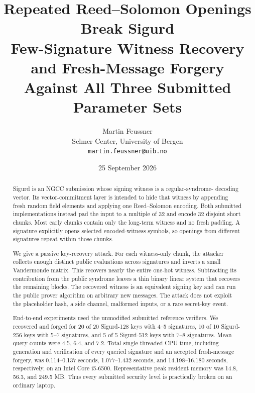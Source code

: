 \documentclass[11pt,a4paper]{article}
\title{\bfseries Repeated Reed--Solomon Openings Break Sigurd\\
\large Few-Signature Witness Recovery and Fresh-Message Forgery\\
Against All Three Submitted Parameter Sets}
\author{Martin Feussner\\
\small Selmer Center, University of Bergen\\
\small \texttt{martin.feussner@uib.no}}
\date{25 September 2026}
\begin{document}
\maketitle

\begin{center}
\end{center}
\vspace{0.7em}

\begin{abstract}
Sigurd is an NGCC submission whose signing witness is a regular-syndrome-
decoding vector.  Its vector-commitment layer is intended to hide that witness
by appending fresh random field elements and applying one Reed--Solomon
encoding.  Both submitted implementations instead pad the input to a multiple
of 32 and encode 32 disjoint short chunks.  Most early chunks contain only the
long-term witness and no fresh padding.  A signature explicitly opens selected
encoded-witness symbols, so openings from different signatures repeat within
those chunks.

We give a passive key-recovery attack.  For each witness-only chunk, the
attacker collects enough distinct public evaluations across signatures and
inverts a small Vandermonde matrix.  This recovers nearly the entire one-hot
witness.  Subtracting its contribution from the public syndrome leaves a thin
binary linear system that recovers the remaining blocks.  The recovered
witness is an equivalent signing key and can run the public prover algorithm
on arbitrary new messages.  The attack does not exploit the placeholder hash,
a side channel, malformed inputs, or a rare secret-key event.

End-to-end experiments used the unmodified submitted reference verifiers.  We
recovered and forged for 20 of 20 Sigurd-128 keys with 4--5 signatures, 10 of
10 Sigurd-256 keys with 5--7 signatures, and 5 of 5 Sigurd-512 keys with 7--8
signatures.  Mean query counts were 4.5, 6.4, and 7.2.  Total single-threaded
CPU time, including generation and verification of every queried signature and
an accepted fresh-message forgery, was 0.114--0.137 seconds, 1.077--1.432
seconds, and 14.198--16.180 seconds, respectively, on an Intel Core i5-6500.
Representative peak resident memory was 14.8, 56.3, and 249.5 MB.  Thus every
submitted security level is practically broken on an ordinary laptop.
\end{abstract}
\end{document}
